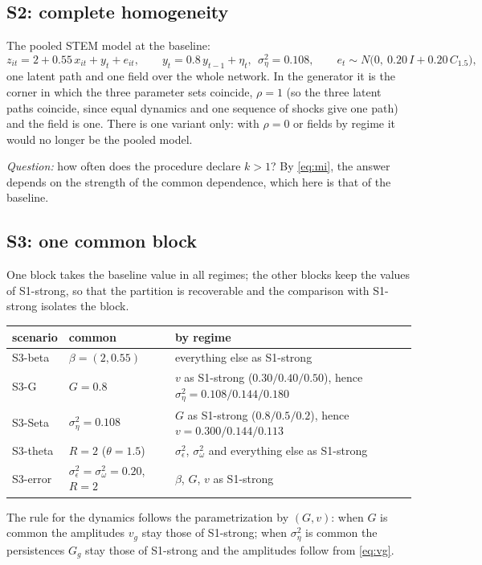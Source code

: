\documentclass[11pt]{article}
\begin{document}
\subsection{S2: complete homogeneity}

The pooled STEM model at the baseline:
\begin{equation}\label{eq:pooled}
  z_{it} = 2 + 0.55\, x_{it} + y_t + e_{it}, \qquad y_t = 0.8\, y_{t-1} + \eta_t,\ \ \sigma^2_\eta = 0.108, \qquad
  e_t \sim N\bigl(0,\ 0.20\, I + 0.20\, C_{1.5}\bigr),
\end{equation}
one latent path and one field over the whole network. In the generator it is the corner in which the three parameter sets coincide, $\rho = 1$ (so the three latent paths coincide, since equal dynamics and one sequence of shocks give one path) and the field is one. There is one variant only: with $\rho = 0$ or fields by regime it would no longer be the pooled model.

\emph{Question:} how often does the procedure declare $k > 1$? By \eqref{eq:mi}, the answer depends on the strength of the common dependence, which here is that of the baseline.

\subsection{S3: one common block}

One block takes the baseline value in all regimes; the other blocks keep the values of S1-strong, so that the partition is recoverable and the comparison with S1-strong isolates the block.
\begin{center}
\begin{tabular}{l>{\raggedright\arraybackslash}p{3.6cm}>{\raggedright\arraybackslash}p{8.4cm}}
\toprule
scenario & common & by regime \\
\midrule
S3-beta  & $\beta = (2, 0.55)$ & everything else as S1-strong \\
S3-G     & $G = 0.8$ & $v$ as S1-strong ($0.30/0.40/0.50$), hence $\sigma^2_\eta = 0.108/0.144/0.180$ \\
S3-Seta  & $\sigma^2_\eta = 0.108$ & $G$ as S1-strong ($0.8/0.5/0.2$), hence $v = 0.300/0.144/0.113$ \\
S3-theta & $R = 2$ ($\theta = 1.5$) & $\sigma^2_\epsilon$, $\sigma^2_\omega$ and everything else as S1-strong \\
S3-error & $\sigma^2_\epsilon = \sigma^2_\omega = 0.20$, $R = 2$ & $\beta$, $G$, $v$ as S1-strong \\
\bottomrule
\end{tabular}
\end{center}
The rule for the dynamics follows the parametrization by $(G, v)$: when $G$ is common the amplitudes $v_g$ stay those of S1-strong; when $\sigma^2_\eta$ is common the persistences $G_g$ stay those of S1-strong and the amplitudes follow from \eqref{eq:vg}.
\end{document}

